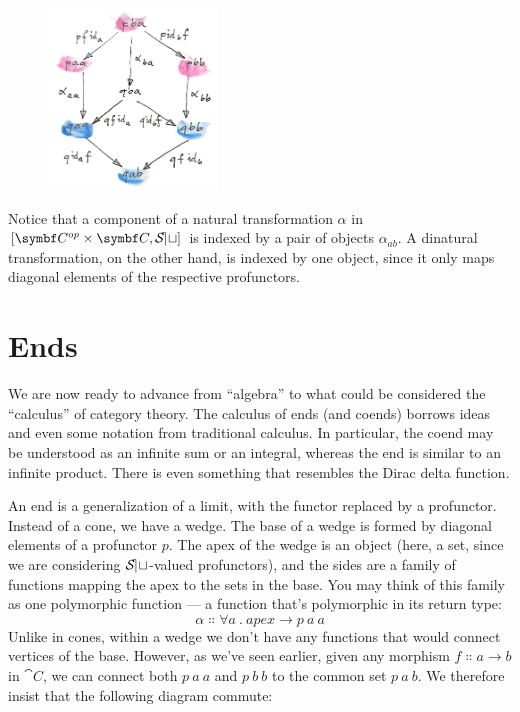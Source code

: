 \begin{figure}[H]
\centering
\includegraphics[width=0.4\textwidth]{images/end-1.jpg}
\end{figure}

\noindent
Notice that a component of a natural transformation $\alpha$ in
${[}\cat{C}^{op}\times{}\cat{C}, \Set{]}$ is indexed by a pair of objects
$\alpha_{a b}$. A dinatural transformation, on the other hand, is
indexed by one object, since it only maps diagonal elements of the
respective profunctors.

\section{Ends}

We are now ready to advance from ``algebra'' to what could be considered
the ``calculus'' of category theory. The calculus of ends (and coends)
borrows ideas and even some notation from traditional calculus. In
particular, the coend may be understood as an infinite sum or an
integral, whereas the end is similar to an infinite product. There is
even something that resembles the Dirac delta function.

An end is a generalization of a limit, with the functor replaced by a
profunctor. Instead of a cone, we have a wedge. The base of a wedge is
formed by diagonal elements of a profunctor $p$. The apex of the
wedge is an object (here, a set, since we are considering
$\mathcal{S\mkern-3mu et}$-valued profunctors), and the sides are a family of
functions mapping the apex to the sets in the base. You may think of
this family as one polymorphic function --- a function that's
polymorphic in its return type:
\[\alpha \Colon \forall a\ .\ apex \to p\ a\ a\]
Unlike in cones, within a wedge we don't have any functions that would
connect vertices of the base. However, as we've seen earlier, given any
morphism $f \Colon a \to b$ in $\cat{C}$, we can connect both
$p\ a\ a$ and $p\ b\ b$ to the common set
$p\ a\ b$. We therefore insist that the following diagram
commute:


